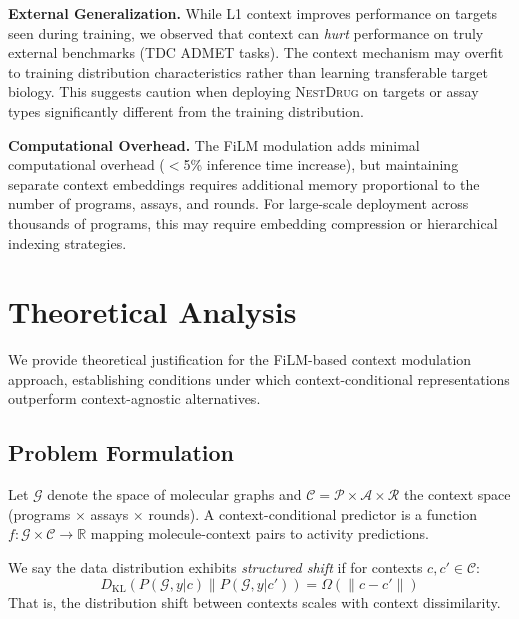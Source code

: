 \documentclass[sigconf,anonymous]{acmart}
\newcommand{\methodname}{\textsc{NestDrug}}
\begin{document}
\textbf{External Generalization.}
While L1 context improves performance on targets seen during training, we observed that context can \textit{hurt} performance on truly external benchmarks (TDC ADMET tasks). The context mechanism may overfit to training distribution characteristics rather than learning transferable target biology. This suggests caution when deploying \methodname{} on targets or assay types significantly different from the training distribution.

\textbf{Computational Overhead.}
The FiLM modulation adds minimal computational overhead ($<$5\% inference time increase), but maintaining separate context embeddings requires additional memory proportional to the number of programs, assays, and rounds. For large-scale deployment across thousands of programs, this may require embedding compression or hierarchical indexing strategies.

\section{Theoretical Analysis}
\label{app:theory}

We provide theoretical justification for the FiLM-based context modulation approach, establishing conditions under which context-conditional representations outperform context-agnostic alternatives.

\subsection{Problem Formulation}

\begin{definition}
Let $\mathcal{G}$ denote the space of molecular graphs and $\mathcal{C} = \mathcal{P} \times \mathcal{A} \times \mathcal{R}$ the context space (programs $\times$ assays $\times$ rounds). A context-conditional predictor is a function $f: \mathcal{G} \times \mathcal{C} \rightarrow \mathbb{R}$ mapping molecule-context pairs to activity predictions.
\end{definition}

\begin{definition}
We say the data distribution exhibits \textit{structured shift} if for contexts $c, c' \in \mathcal{C}$:
\begin{equation}
    D_{\text{KL}}\left( P(\mathcal{G}, y | c) \| P(\mathcal{G}, y | c') \right) = \Omega(\|c - c'\|)
\end{equation}
That is, the distribution shift between contexts scales with context dissimilarity.
\end{definition}
\end{document}
